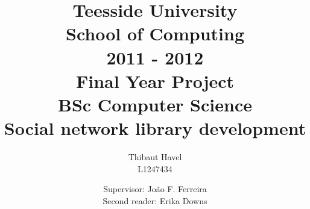 \documentclass[12pt,a4paper,utf8x]{report}
\title
{
	\normalsize
	{
		Teesside University\\
		School of Computing\\
		2011 - 2012\\
	}
	\vspace{45mm}
	\textbf{Final Year Project}\\
	\normalsize{BSc Computer Science}\\
	\vspace{10mm}
	\huge{Social network library development}\\
}
\author
{
	Thibaut Havel\\
	\normalsize{L1247434}\\
	\vspace{45mm}
}
\date
{
	\normalsize
	{
		Supervisor: Jo\~{a}o F. Ferreira\\
		Second reader: Erika Downs
	}
}
\begin{document}
\maketitle
\begin{onehalfspace}


\tableofcontents










\nocite{*}
\end{onehalfspace}
\printindex
\end{document}
